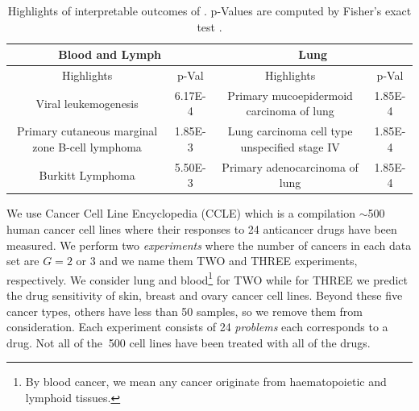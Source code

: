 %
\begin{table}[bp]
	\centering
	{\small
		\begin{tabular}{ |c|c|c|c|  }
			\hline 	
			\multicolumn{2}{|c|}{Blood and Lymph} & \multicolumn{2}{c|}{Lung}\\
			\hline
			Highlights &    p-Val  & Highlights &    p-Val   \\
			\hline
			Viral leukemogenesis		 & 6.17E-4  & Primary mucoepidermoid carcinoma of lung & 1.85E-4  \\
			Primary cutaneous marginal zone B-cell lymphoma	 & 1.85E-3   & Lung carcinoma cell type unspecified stage IV	& 1.85E-4   \\
			Burkitt Lymphoma	 & 5.50E-3  & Primary adenocarcinoma of lung  & 1.85E-4 \\
			\hline
		\end{tabular}
		\caption{Highlights of interpretable outcomes of \dc{}. p-Values are computed by  Fisher's exact test \cite{chen09toppgene}.}
		\label{table:1}}
\end{table}
We use Cancer Cell Line Encyclopedia (CCLE) \cite{barretina2012cancer} which is a compilation $\sim$500 human cancer cell lines where their responses to 24 anticancer drugs have been measured.%
We perform two \emph{experiments} where the number of cancers in each data set are $G =2$ or $3$ and we name them TWO and THREE experiments, respectively. 
We consider lung and blood\footnote{By blood cancer, we mean any cancer originate from haematopoietic and lymphoid tissues.} 
for TWO while for THREE we predict the drug sensitivity of skin, breast and ovary cancer cell lines. 
Beyond these five cancer types, others have less than 50 samples, so we remove them from consideration.
Each experiment consists of 24 \emph{problems} each corresponds to a drug. %
Not all of the $~$500 cell lines have been treated with all of the drugs. 

